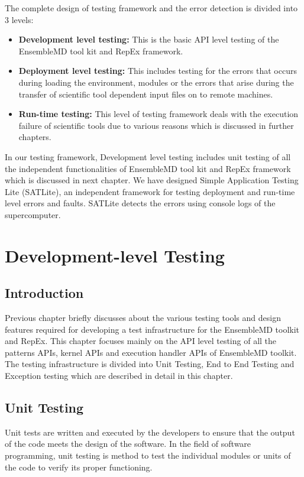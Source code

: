 \documentclass[10pt]{ruthesis}
\begin{document}
The complete design of testing framework and the error detection is divided into 3 levels:

\begin{itemize}
\item \textbf{Development level testing:} This is the basic API level testing of the EnsembleMD tool kit and RepEx framework.
\item \textbf{Deployment level testing:} This includes testing for the errors that occurs during loading the environment, modules or the errors that arise during the transfer of scientific tool dependent input files on to remote machines. 
\item \textbf{Run-time testing:} This level of testing framework deals with the execution failure of scientific tools due to various reasons which is discussed in further chapters. 
\end{itemize}

In our testing framework, Development level testing includes unit testing of all the independent functionalities of EnsembleMD tool kit and RepEx framework which is discussed in next chapter. We have designed Simple Application Testing Lite (SATLite), an independent framework for testing deployment and run-time level errors and faults. SATLite detects the errors using console logs of the supercomputer.


\chapter{Development-level Testing}

\section{Introduction}
Previous chapter briefly discusses about the various testing tools and design features required for developing a test infrastructure for the EnsembleMD toolkit and RepEx. This chapter focuses mainly on the API level testing of all the patterns APIs, kernel APIs and execution handler APIs of EnsembleMD toolkit. The testing infrastructure is divided into Unit Testing, End to End Testing and Exception testing which are described in detail in this chapter.

\section{Unit Testing}
Unit tests are written and executed by the developers to ensure that the output of the code meets the design of the software. In the field of software programming, unit testing is method to test the individual modules or units of the code to verify its proper functioning. 
\end{document}
